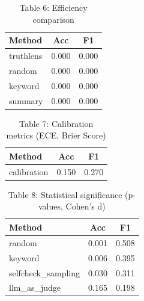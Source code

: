\begin{table}[h]
\centering
\begin{tabular}{lcc}
Method & Acc & F1 \\ 
\hline
truthlens & 0.000 & 0.000 \\
random & 0.000 & 0.000 \\
keyword & 0.000 & 0.000 \\
summary & 0.000 & 0.000 \\
\end{tabular}
\caption{Table 6: Efficiency comparison}
\end{table}


\begin{table}[h]
\centering
\begin{tabular}{lcc}
Method & Acc & F1 \\ 
\hline
calibration & 0.150 & 0.270 \\
\end{tabular}
\caption{Table 7: Calibration metrics (ECE, Brier Score)}
\end{table}


\begin{table}[h]
\centering
\begin{tabular}{lcc}
Method & Acc & F1 \\ 
\hline
random & 0.001 & 0.508 \\
keyword & 0.006 & 0.395 \\
selfcheck_sampling & 0.030 & 0.311 \\
llm_as_judge & 0.165 & 0.198 \\
\end{tabular}
\caption{Table 8: Statistical significance (p-values, Cohen's d)}
\end{table}
